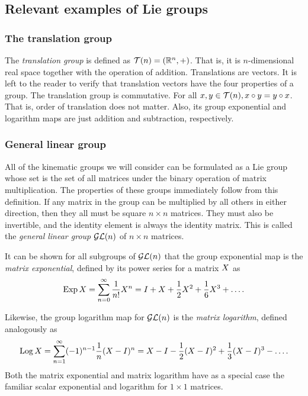 \documentclass[../main.tex]{subfiles}
\begin{document}
\begin{refsection}

\subsection{Relevant examples of Lie groups}\label{relevant-examples-of-lie-groups}

\subsubsection{The translation group}\label{the-translation-group}

The \emph{translation group} is defined as $\mathcal{T}(n) = (\mathbb{R}^n, +)$.
That is, it is $n$-dimensional real space together with the operation of addition.
Translations are vectors.
It is left to the reader to verify that translation vectors have the four properties of a group.
The translation group is commutative.
For all $x,y \in \mathcal{T}(n), x \circ y = y \circ x$.
That is, order of translation does not matter.
Also, its group exponential and logarithm maps are just addition and subtraction, respectively.

\subsubsection{General linear group}\label{general-linear-group}

All of the kinematic groups we will consider can be formulated as a Lie group whose set is the set of all matrices under the binary operation of matrix multiplication.
The properties of these groups immediately follow from this definition.
If any matrix in the group can be multiplied by all others in either direction, then they all must be square $n \times n$ matrices.
They must also be invertible, and the identity element is always the identity matrix.
This is called the \emph{general linear group} $\mathcal{GL}(n)$ of $n \times n$ matrices.

It can be shown for all subgroups of $\mathcal{GL}(n)$ that the group exponential map is the \emph{matrix exponential}, defined by its power series for a matrix $\mat{X}$ as
\[
\expm \mat{X} = \sum_{n=0}^\infty \frac{1}{n!} X^n
              = I + X + \frac{1}{2} X^2 + \frac{1}{6} X^3 + \ldots.
\]

Likewise, the group logarithm map for $\mathcal{GL}(n)$ is the \emph{matrix logarithm}, defined analogously as
\[
\logm \mat{X} = \sum_{n=1}^\infty (-1)^{n-1} \frac{1}{n} (X - I)^n
              = X - I - \frac{1}{2} (X - I)^2 + \frac{1}{3} (X - I)^3 - \ldots.
\]
Both the matrix exponential and matrix logarithm have as a special case the familiar scalar exponential and logarithm for $1 \times 1$ matrices.


\end{refsection}
\end{document}

